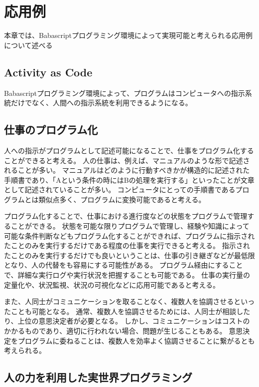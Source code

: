 \chapter{応用例}
\label{chap:application}

本章では、Babascriptプログラミング環境によって実現可能と考えられる応用例について述べる

\section{Activity as Code}\label{activity-as-code}

Babascriptプログラミング環境によって、プログラムはコンピュータへの指示系統だけでなく、人間への指示系統を利用できるようになる。

\section{仕事のプログラム化}\label{ux4ed5ux4e8bux306eux30d7ux30edux30b0ux30e9ux30e0ux5316}

人への指示がプログラムとして記述可能になることで、仕事をプログラム化することができると考える。
人の仕事は、例えば、マニュアルのような形で記述されることが多い。
マニュアルはどのように行動すべきかが構造的に記述された手順書であり、「Aという条件の時にはBの処理を実行する」といったことが文章として記述されていることが多い。
コンピュータにとっての手順書であるプログラムとは類似点多く、プログラムに変換可能であると考える。

プログラム化することで、仕事における進行度などの状態をプログラムで管理することができる。
状態を可能な限りプログラムで管理し、経験や知識によって可能な条件判断などもプログラム化することができれば、プログラムに指示されたことのみを実行するだけである程度の仕事を実行できると考える。
指示されたことのみを実行するだけでも良いということは、仕事の引き継ぎなどが最低限となり、人の代替をも容易にする可能性がある。
プログラム経由にすることで、詳細な実行ログや実行状況を把握することも可能である。
仕事の実行量の定量化や、状況監視、状況の可視化などに応用可能であると考える。

また、人同士がコミュニケーションを取ることなく、複数人を協調させるといったことも可能となる。
通常、複数人を協調させるためには、人同士が相談したり、上位の意思決定者が必要となる。
しかし、コミュニケーションはコストのかかるものであり、適切に行われない場合、問題が生じることもある。
意思決定をプログラムに委ねることは、複数人を効率よく協調させることに繋がるとも考えられる。

\section{人の力を利用した実世界プログラミング}\label{ux4ebaux306eux529bux3092ux5229ux7528ux3057ux305fux5b9fux4e16ux754cux30d7ux30edux30b0ux30e9ux30dfux30f3ux30b0}

